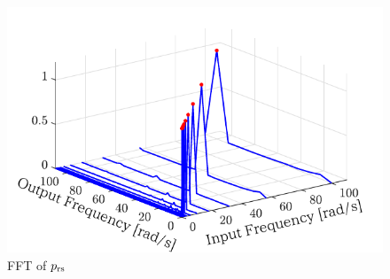 \begin{figure}[t]
    \centering
        \includegraphics[keepaspectratio, scale=1.0]{contents/システム同定/figure/1018FFT_prs.pdf}
        \caption{FFT of $p_\mathrm{rs}$}
        \label{fig:1018FFT_prs}
\end{figure}


